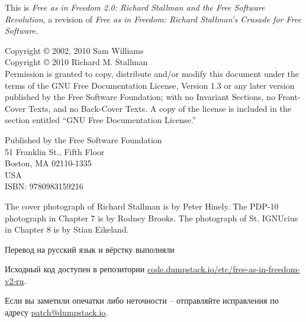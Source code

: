 \noindent This is \textit{Free as in Freedom 2.0: Richard Stallman and
  the Free Software Revolution}, a revision of \textit{Free as in
  Freedom: Richard Stallman's Crusade for Free Software}.

\bigskip

\noindent Copyright \copyright{} 2002, 2010 Sam Williams\\
Copyright \copyright{} 2010 Richard M. Stallman\\
Permission is granted to copy, distribute and/or modify
this document under the terms of the GNU Free Documentation License,
Version 1.3 or any later version published by the Free Software
Foundation; with no Invariant Sections, no Front-Cover Texts, and no
Back-Cover Texts. A copy of the license is included in the section
entitled ``GNU Free Documentation License.''

\bigskip

\noindent Published by the Free Software Foundation\\
51 Franklin St., Fifth Floor\\
Boston, MA 02110-1335\\
USA\\
ISBN: 9780983159216\\

\bigskip

\noindent The cover photograph of Richard Stallman is by Peter Hinely. The PDP-10 photograph in Chapter 7 is by Rodney Brooks. The photograph of St. IGNUcius in Chapter 8 is by Stian Eikeland. 

\bigskip

Перевод на русский язык и вёрстку выполняли 

Исходный код доступен в репозитории
\href{https://code.dumpstack.io/etc/free-as-in-freedom-v2-ru}{code.dumpstack.io/etc/free-as-in-freedom-v2-ru}.

Если вы заметили опечатки либо неточности -- отправляйте исправления по адресу
\href{mailto:patch@dumpstack.io}{patch@dumpstack.io}.

\theendnotes
\setcounter{endnote}{0}
